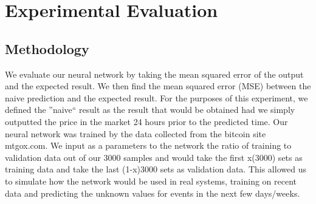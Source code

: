 \documentclass[a4paper,11pt]{article}
\begin{document}
\section{Experimental Evaluation}
\subsection{Methodology}
We evaluate our neural network by taking the mean squared error of the output and the expected result. We then find the mean squared error (MSE) between the naive prediction and the expected result. For the purposes of this experiment, we defined the ''naive`` result as the result that would be obtained had we simply outputted the price in the market 24 hours prior to the predicted time. 
Our neural network was trained by the data collected from the bitcoin site mtgox.com. We input as a parameters to the network the ratio of training to validation data out of our 3000 samples and would take the first x(3000) sets as training data and take the last (1-x)3000 sets as validation data. This allowed us to simulate  how the network would be used in real systems, training on recent data and predicting the unknown values for events in the next few days/weeks. 
\end{document}
